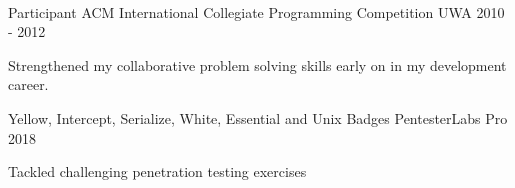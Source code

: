 
 \

\begin{cventries}

  \cventry
    {Participant} %
    {ACM International Collegiate Programming Competition} %
    {UWA} %
    {2010 - 2012} %
    {
      \begin{cvitems} %
        \item {Strengthened my collaborative problem solving skills early on in my development career.}
      \end{cvitems}
    }

  \cventry
    {Yellow, Intercept, Serialize, White, Essential and Unix Badges} %
    {PentesterLabs Pro} %
    {} %
    {2018} %
    {
    \begin{cvitems} %
      \item {Tackled challenging penetration testing exercises}
    \end{cvitems}
    }

\end{cventries}
